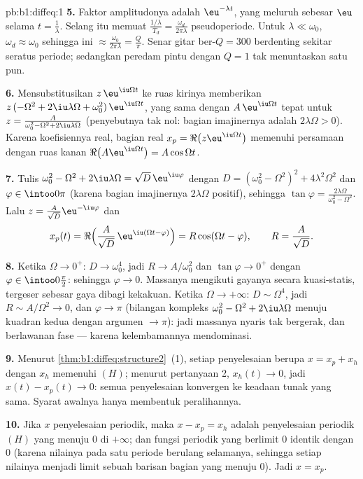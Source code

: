 \begin{solution}{pb:b1:diffeq:1}
\textbf{5.} Faktor amplitudonya adalah $\eu^{-\lambda t}$, yang
meluruh sebesar $\eu$ selama $t = \frac1\lambda$. Selang itu memuat
$\frac{1/\lambda}{T_d} = \frac{\omega_d}{2\pi\lambda}$
pseudoperiode. Untuk $\lambda \ll \omega_0$, $\omega_d \approx
\omega_0$ sehingga ini $\approx \frac{\omega_0}{2\pi\lambda} =
\frac Q\pi$. Senar gitar ber-$Q = 300$ berdenting sekitar seratus
periode; sedangkan peredam pintu dengan $Q = 1$ tak menuntaskan satu pun.

\textbf{6.} Mensubstitusikan $z\,\eu^{\iu\Omega t}$ ke ruas
kirinya memberikan $z\,(-\Omega^2 + 2\iu\lambda\Omega +
\omega_0^2)\,\eu^{\iu\Omega t}$, yang sama dengan $A\,\eu^{\iu\Omega
t}$ tepat untuk $z = \frac{A}{\omega_0^2 - \Omega^2 +
2\iu\lambda\Omega}$ (penyebutnya tak nol: bagian imajinernya
adalah $2\lambda\Omega > 0$). Karena koefisiennya real,
bagian real $x_p = \Re\bigl(z\eu^{\iu\Omega t}\bigr)$ memenuhi
persamaan dengan ruas kanan $\Re\bigl(A\eu^{\iu\Omega t}\bigr) =
A\cos\Omega t$.

\textbf{7.} Tulis $\omega_0^2 - \Omega^2 + 2\iu\lambda\Omega =
\sqrt{D}\,\eu^{\iu\varphi}$ dengan $D = (\omega_0^2 - \Omega^2)^2 +
4\lambda^2\Omega^2$ dan $\varphi \in \intoo0\pi$ (karena bagian
imajinernya $2\lambda\Omega$ positif), sehingga $\tan\varphi =
\frac{2\lambda\Omega}{\omega_0^2 - \Omega^2}$. Lalu $z =
\frac{A}{\sqrt D}\eu^{-\iu\varphi}$ dan
\[
x_p(t) = \Re\Bigl(\frac A{\sqrt D}\,\eu^{\iu(\Omega t -
\varphi)}\Bigr) = R\cos(\Omega t - \varphi),
\qquad R = \frac A{\sqrt D} .
\]

\textbf{8.} Ketika $\Omega \to 0^+$: $D \to \omega_0^4$, jadi $R \to
A/\omega_0^2$ dan $\tan\varphi \to 0^+$ dengan $\varphi \in
\intoo0{\frac\pi2}$: sehingga $\varphi \to 0$. Massanya mengikuti gayanya
secara kuasi-statis, tergeser sebesar gaya dibagi kekakuan. Ketika $\Omega \to
+\infty$: $D \sim \Omega^4$, jadi $R \sim A/\Omega^2 \to 0$, dan
$\varphi \to \pi$ (bilangan kompleks $\omega_0^2 - \Omega^2 +
2\iu\lambda\Omega$ menuju kuadran kedua dengan argumen $\to
\pi$): jadi massanya nyaris tak bergerak, dan berlawanan fase ---
karena kelembamannya mendominasi.

\textbf{9.} Menurut \cref{thm:b1:diffeq:structure2}~(1), setiap penyelesaian
berupa $x = x_p + x_h$ dengan $x_h$ memenuhi $(H)$; menurut pertanyaan 2, $x_h(t)
\to 0$, jadi $x(t) - x_p(t) \to 0$: semua penyelesaian konvergen ke
keadaan tunak yang sama. Syarat awalnya hanya membentuk peralihannya.

\textbf{10.} Jika $x$ penyelesaian periodik, maka $x - x_p = x_h$ adalah
penyelesaian periodik $(H)$ yang menuju $0$ di $+\infty$; dan
fungsi periodik yang berlimit $0$ identik dengan $0$ (karena nilainya pada
satu periode berulang selamanya, sehingga setiap nilainya menjadi limit sebuah
barisan bagian yang menuju $0$). Jadi $x = x_p$.


\end{solution}
